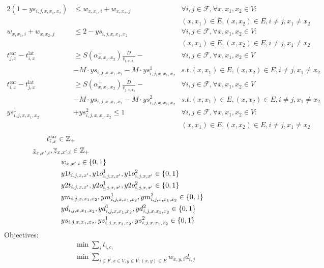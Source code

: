 \documentclass[../thesis.tex]{subfiles}
\begin{document}
\begin{align}
    2(1-ys_{i,j,x,x_1,x_2})& \leq w_{x,x_1,i} + w_{x,x_2,j} 
    & \forall i,j\in\mathcal F,\forall x,x_1,x_2\in V:
    \nonumber\\ &&(x,x_1)\in E,(x,x_2)\in E, i\neq j, x_1\neq x_2\\
    w_{x,x_1,i} + w_{x,x_2,j} &\leq 2- ys_{i,j,x,x_1,x_2}
    & \forall i,j\in\mathcal F,\forall x,x_1,x_2\in V:
    \nonumber\\ &&(x,x_1)\in E,(x,x_2)\in E, i\neq j, x_1\neq x_2\\
    t^\text{ear}_{j,x}-t^\text{lat}_{i,x}&\geq S(\alpha^+_{x,x_1,x_2}) \frac D{\underline v_{i,x,x_1}} -& \forall i,j\in\mathcal F,\forall x,x_1,x_2\in V
    \nonumber\\&- M\cdot ys_{i,j,x,x_1,x_2}- M\cdot ys^1_{i,j,x,x_1,x_2} 
    &s.t. (x,x_1)\in E, (x,x_2)\in E, i\neq j, x_1\neq x_2\\
    t^\text{ear}_{i,x}-t^\text{lat}_{j,x}&\geq S(\alpha^+_{x,x_1,x_2})\frac D {\underline v_{j,x,x_2}} -& \forall i,j\in\mathcal F,\forall x,x_1,x_2\in V
    \nonumber\\&- M\cdot ys_{i,j,x,x_1,x_2}- M\cdot ys^2_{i,j,x,x_1,x_2}
   & s.t. (x,x_1)\in E,(x,x_2)\in E, i\neq j, x_1\neq x_2\\
    ys^1_{i,j,x,x_1,x_2} &+ ys^2_{i,j,x,x_1,x_2}\leq 1
    & \forall i,j\in\mathcal F,\forall x,x_1,x_2\in V:
    \nonumber\\ &&(x,x_1)\in E,(x,x_2)\in E, i\neq j, x_1\neq x_2
\end{align}
\begin{align}
    &\mathclap{t^\text{ear}_{i,x} \in \mathbb{Z}_{+}} \nonumber 
    \\\nonumber
    &\mathclap{\underline z_{x,x',i}, \overline z_{x,x',i}\in \mathbb{Z}_{+}}
    \\\nonumber
    &w_{x,x',i} \in \{0,1\}
    \\\nonumber
    &y1t_{i,j,x,x'},y1o^1_{i,j,x,x'},y1o^2_{i,j,x,x'}\in\{0,1\}
    \\\nonumber
    &y2t_{i,j,x,x'},y2o^1_{i,j,x,x'},y2o^2_{i,j,x,x'} \in \{0,1\}
    \\\nonumber
    &ym_{i,j,x,x_1,x_2},ym^1_{i,j,x,x_1,x_2},ym^2_{i,j,x,x_1,x_2}\in\{0,1\}
    \\\nonumber
    &yd_{i,j,x,x_1,x_2},yd^1_{i,j,x,x_1,x_2},yd^2_{i,j,x,x_1,x_2}\in\{0,1\}
    \\\nonumber
    &ys_{i,j,x,x_1,x_2},ys^1_{i,j,x,x_1,x_2},ys^2_{i,j,x,x_1,x_2}\in\{0,1\}
\end{align}
Objectives:
\begin{align}
    &\min \sum_{i} t_{i,e_{i}}\\
    &\min \sum_{i \in F,x \in V,y \in V:(x,y)\in E} w_{x,y,i}d_{i,j}
\end{align}
\end{document}
